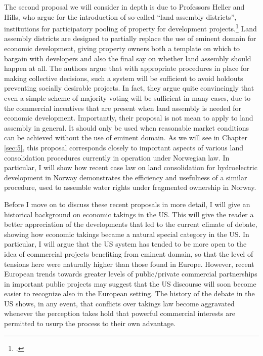 {The second proposal we will consider in depth is due to Professors Heller and Hills, who argue for the introduction of so-called ``land assembly districts'', institutions for participatory pooling of property for development projects.\footcite{heller08} Land assembly  districts are designed to partially replace the use of eminent domain for economic development, giving property owners both a template on which to bargain with developers and also the final say on whether land assembly should happen at all. The authors argue that with appropriate procedures in place for making collective decisions, such a system will be sufficient to avoid holdouts preventing socially desirable projects. In fact, they argue quite convincingly that even a simple scheme of majority voting will be sufficient in many cases, due to the commercial incentives that are present when land assembly is needed for economic development. Importantly, their proposal is not mean to apply to land assembly in general. It should only be used when reasonable market conditions can be achieved without the use of eminent domain. As we will see in Chapter \ref{sec:5}, this proposal corresponds closely to important aspects of various land consolidation procedures currently in operation under Norwegian law. In particular, I will show how recent case law on land consolidation for hydroelectric development in Norway demonstrates the efficiency and usefulness of a similar procedure, used to assemble water rights under fragmented ownership in Norway.

Before I move on to discuss these recent proposals in more detail, I will give an historical background on economic takings in the US. This will give the reader a better appreciation of the developments that led to the current climate of debate, showing how economic takings became a natural special category in the US. In particular, I will argue that the US system has tended to be more open to the idea of commercial projects benefiting from eminent domain, so that the level of tensions here were naturally higher than those found in Europe. However, recent European trends towards greater levels of public/private commercial partnerships in important public projects may suggest that the US discourse will soon become easier to recognize also in the European setting. The history of the debate in the US shows, in any event, that conflicts over takings law become aggravated whenever the perception takes hold that powerful commercial interests are permitted to usurp the process to their own advantage.
}

